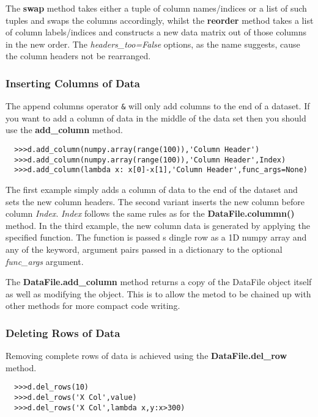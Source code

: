 \documentclass[a4paper,11pt]{scrartcl}
\begin{document}
The \textbf{swap} method takes either a tuple of column names/indices or a list of such tuples and swaps the columns accordingly, whilst the \textbf{reorder} method takes a list of column labels/indices and constructs a new data matrix out of those columns in the new order. The \textit{headers\_too=False} options, as the name suggests, cause the column headers not be rearranged.

\subsubsection{Inserting Columns of Data}
The append columns operator \verb#&# will only add columns to the end of a
dataset. If you want to add a column of data in the middle of the data set then
you should use the \textbf{add\_column} method.

\begin{verbatim}
  >>>d.add_column(numpy.array(range(100)),'Column Header')
  >>>d.add_column(numpy.array(range(100)),'Column Header',Index)
  >>>d.add_column(lambda x: x[0]-x[1],'Column Header',func_args=None)
\end{verbatim}

The first example simply adds a column of data to the end of the dataset and
sets the new column headers. The second variant  inserts the new column before
column \textit{Index}. \textit{Index} follows the same rules as for the
\textbf{DataFile.colummn()} method. In the third example, the new column data is
generated by applying the specified function. The function is passed s dingle
row as a 1D numpy array and any of the keyword, argument pairs passed in a
dictionary to the optional \textit{func\_args} argument.

The \textbf{DataFile.add\_column} method returns a copy of the DataFile object
itself as well as modifying the object. This is to allow the metod to be chained
up with other methods for more compact code writing.

\subsubsection{Deleting Rows of Data}

Removing complete rows of data is achieved using the \textbf{DataFile.del\_row}
method.

\begin{verbatim}
  >>>d.del_rows(10)
  >>>d.del_rows('X Col',value)
  >>>d.del_rows('X Col',lambda x,y:x>300)
\end{verbatim}
\end{document}
